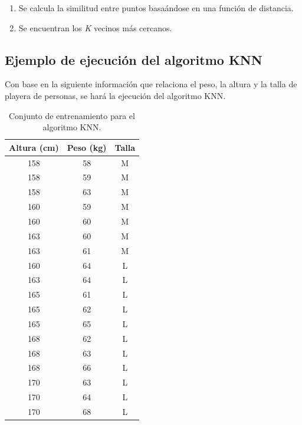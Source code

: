 \begin{enumerate}
	\item Se calcula la similitud entre puntos basaándose en una función de distancia.\\
	\item Se encuentran los \emph{K} vecinos más cercanos.\\
\end{enumerate}

\subsection{Ejemplo de ejecución del algoritmo KNN}
Con base en la siguiente información que relaciona el peso, la altura y la talla de playera de personas, se hará la ejecución del algoritmo KNN.\\

	\begin{table}[H]
		\begin{center}
			\label{tab:tablaKNN}
			\begin{tabular}{c|c|c}
				\textbf{Altura (cm)} & \textbf{Peso (kg)} & \textbf{Talla}\\
				\hline
				158 & 58 & M\\
				158 & 59 & M\\
				158 & 63 & M\\
				160 & 59 & M\\
				160 & 60 & M\\
				163 & 60 & M\\
				163 & 61 & M\\
				160 & 64 & L\\
				163 & 64 & L\\
				165 & 61 & L\\
				165 & 62 & L\\
				165 & 65 & L\\
				168 & 62 & L\\
				168 & 63 & L\\
				168 & 66 & L\\
				170 & 63 & L\\
				170 & 64 & L\\
				170 & 68 & L\\
			\end{tabular}
		\end{center}
		\caption{Conjunto de entrenamiento para el algoritmo KNN.}
	\end{table}

